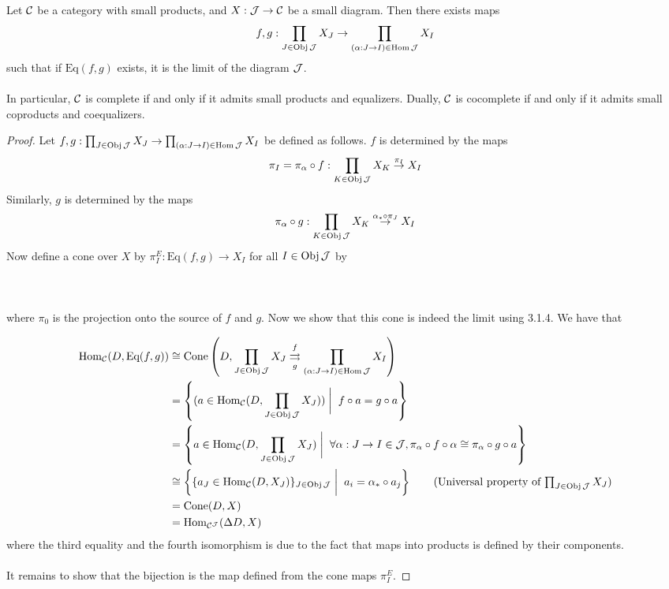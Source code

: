 \documentclass[a4paper]{article}
\begin{document}
\begin{thm}{}{} Let $\mathcal{C}$ be a category with small products, and $X:\mathcal{J}\to\mathcal{C}$ be a small diagram. Then there exists maps $$f,g:\prod_{J\in\operatorname{Obj}\mathcal{J}}X_J\to\prod_{(\alpha:J\to I)\in\operatorname{Hom}\mathcal{J}}X_I$$ such that if $\text{Eq}(f,g)$ exists, it is the limit of the diagram $\mathcal{J}$. \\~\\

In particular, $\mathcal{C}$ is complete if and only if it admits small products and equalizers. Dually, $\mathcal{C}$ is cocomplete if and only if it admits small coproducts and coequalizers. \tcbline
\begin{proof}
Let $f,g:\prod_{J\in\operatorname{Obj}\mathcal{J}}X_J\to\prod_{(\alpha:J\to I)\in\operatorname{Hom}\mathcal{J}}X_I$ be defined as follows. $f$ is determined by the maps $$\pi_I=\pi_\alpha\circ f:\prod_{K\in\operatorname{Obj}\mathcal{J}}X_K\overset{\pi_I}{\rightarrow}X_I$$ Similarly, $g$ is determined by the maps $$\pi_\alpha\circ g:\prod_{K\in\operatorname{Obj}\mathcal{J}}X_K\overset{\alpha_\ast\circ\pi_J}{\rightarrow}X_I$$ Now define a cone over $X$ by $\pi_I^E:\text{Eq}(f,g)\to X_I$ for all $I\in\operatorname{Obj}\mathcal{J}$ by \\~\\
 \\~\\
where $\pi_0$ is the projection onto the source of $f$ and $g$. Now we show that this cone is indeed the limit using 3.1.4. We have that 

\begin{align*}
\Hom_\mC(D,\text{Eq}(f,g))&\cong\text{Cone}\left(D,\prod_{J\in\Obj\mJ}X_J\overset{f}{\underset{g}{\rightrightarrows}}\prod_{(\alpha:J\to I)\in\Hom\mJ}X_I\right)\\
&=\left\{(a\in\Hom_\mC(D,\prod_{J\in\Obj\mJ}X_J))\;\bigg{|}\;\; f\circ a=g\circ a\right\}\\
&=\left\{a\in\Hom_\mC(D,\prod_{J\in\Obj\mJ}X_J)\;\bigg{|}\;\;\forall\alpha:J\to I\in\mJ, \pi_\alpha\circ f\circ\alpha\cong\pi_\alpha\circ g\circ a\right\}\\
&\cong\left\{\{a_J\in\Hom_\mC(D,X_J)\}_{J\in\Obj\mJ}\;\bigg{|}\;\; a_i=\alpha_\ast\circ a_j\right\}\tag{Universal property of $\prod_{J\in\Obj\mJ}X_J$}\\
&=\text{Cone}(D,X)\\
&=\Hom_{\mC^\mJ}(\Delta D,X)
\end{align*}
where the third equality and the fourth isomorphism is due to the fact that maps into products is defined by their components. \\~\\

It remains to show that the bijection is the map defined from the cone maps $\pi_I^E$. 
\end{proof}
\end{thm}
\end{document}
